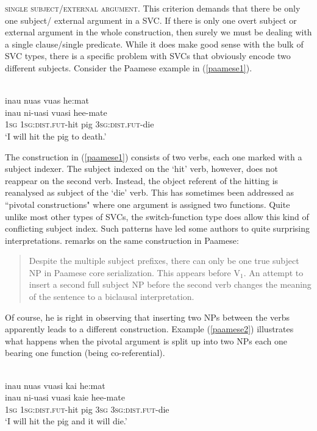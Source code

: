 \textsc{single subject/external argument}. This criterion demands that there be only one subject/ external argument in a SVC. If there is only one overt subject or external argument in the whole construction, then surely we must be dealing with a single clause/single predicate. While it does make good sense with the bulk of SVC types, there is a specific problem with SVCs that obviously encode two different subjects. Consider the Paamese example in (\ref{paamese1}).

\ea \label{paamese1}
\\
\glll inau nuas vuas he:mat \\
inau ni-uasi vuasi hee-mate \\
\textsc{1}\textsc{sg} \textsc{1}\textsc{sg}:\textsc{dist}.\textsc{fut}-hit pig \textsc{3}\textsc{sg}:\textsc{dist}.\textsc{fut}-die \\
\glft `I will hit the pig to death.' \\ 
\z

The construction in (\ref{paamese1}) consists of two verbs, each one marked with a subject indexer. The subject indexed on the `hit' verb, however, does not reappear on the second verb. Instead, the object referent of the hitting is reanalysed as subject of the `die' verb. This has sometimes been addressed as ``pivotal constructions" where one argument is assigned two functions. Quite unlike most other types of SVCs, the switch-function type does allow this kind of conflicting subject index. Such patterns have led some authors to quite surprising interpretations. \citet[292]{Durie1997} remarks on the same construction in Paamese: \begin{quote}Despite the multiple subject prefixes, there can only be one true subject NP in Paamese core serialization. This appears before V$_1$. An attempt to insert a second full subject NP before the second verb changes the meaning of the sentence to a biclausal interpretation.\end{quote}

Of course, he is right in observing that inserting two NPs between the verbs apparently leads to a different construction. Example (\ref{paamese2}) illustrates what happens when the pivotal argument is split up into two NPs each one bearing one function (being co-referential).

\ea \label{paamese2}
\\
\glll inau nuas vuasi kai he:mat \\
inau ni-uasi vuasi kaie hee-mate \\
\textsc{1}\textsc{sg} \textsc{1}\textsc{sg}:\textsc{dist}.\textsc{fut}-hit pig \textsc{3}\textsc{sg} \textsc{3}\textsc{sg}:\textsc{dist}.\textsc{fut}-die \\
\glft `I will hit the pig and it will die.'\\ 
\z

